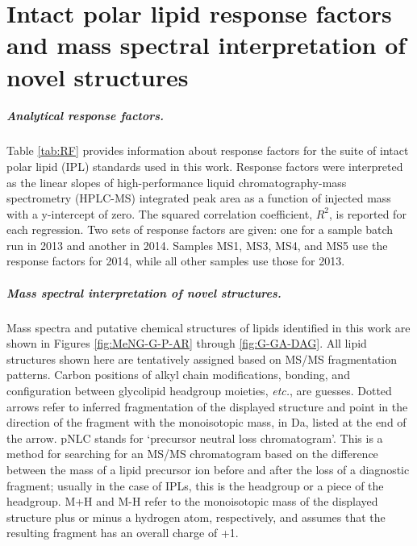 \chapter{Intact polar lipid response factors and mass spectral interpretation of novel structures}\label{app1}

\clearpage

\doublespace

\paragraph*{Analytical response factors.} Table \ref{tab:RF} provides information about response factors for the suite of intact polar lipid (IPL) standards used in this work. Response factors were interpreted as the linear slopes of high-performance liquid chromatography-mass spectrometry (HPLC-MS) integrated peak area as a function of injected mass with a y-intercept of zero. The squared correlation coefficient, $R^{2}$, is reported for each regression. Two sets of response factors are given: one for a sample batch run in 2013 and another in 2014. Samples MS1, MS3, MS4, and MS5 use the response factors for 2014, while all other samples use those for 2013.

\paragraph*{Mass spectral interpretation of novel structures.} Mass spectra and putative chemical structures of lipids identified in this work are shown in Figures \ref{fig:MeNG-G-P-AR} through \ref{fig:G-GA-DAG}. All lipid structures shown here are tentatively assigned based on MS/MS fragmentation patterns. Carbon positions of alkyl chain modifications, bonding, and configuration between glycolipid headgroup moieties, \textit{etc.}, are guesses. Dotted arrows refer to inferred fragmentation of the displayed structure and point in the direction of the fragment with the monoisotopic mass, in Da, listed at the end of the arrow. pNLC stands for `precursor neutral loss chromatogram'. This is a method for searching for an MS/MS chromatogram based on the difference between the mass of a lipid precursor ion before and after the loss of a diagnostic fragment; usually in the case of IPLs, this is the headgroup or a piece of the headgroup. M+H and M-H refer to the monoisotopic mass of the displayed structure plus or minus a hydrogen atom, respectively, and assumes that the resulting fragment has an overall charge of +1.

